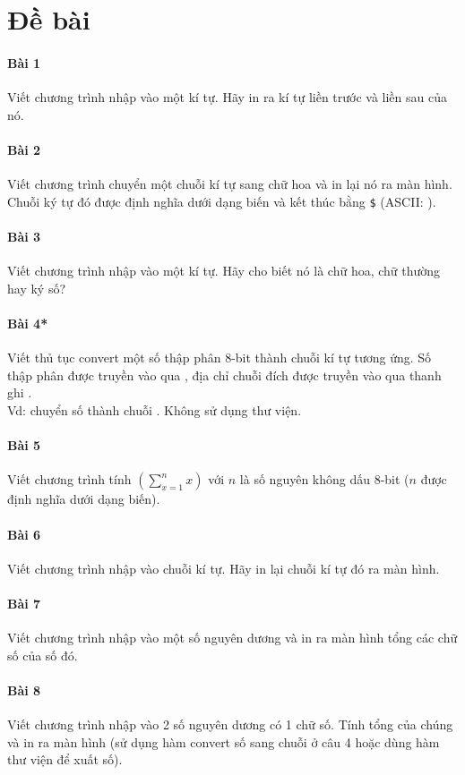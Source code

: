 \documentclass[main.tex]{subfiles}
\begin{document}
\newcommand{\textD}{\textcolor{OliveGreen}{\cd{Đ}}}
\newcommand{\textS}{\textcolor{red}{\cd{S}}}

\section{Đề bài}
\paragraph{Bài 1} Viết chương trình nhập vào một kí tự. Hãy in ra kí tự liền trước và liền sau của nó.
\paragraph{Bài 2} Viết chương trình chuyển một chuỗi kí tự sang chữ hoa và in lại nó ra màn hình. Chuỗi ký tự đó được định nghĩa dưới dạng biến và kết thúc bằng \verb#$# (ASCII: ).
\paragraph{Bài 3} Viết chương trình nhập vào một kí tự. Hãy cho biết nó là chữ hoa, chữ thường hay ký số?
\paragraph{Bài 4*} Viết thủ tục convert một số thập phân 8-bit thành chuỗi kí tự tương ứng. Số thập phân được truyền vào qua , địa chỉ chuỗi đích được truyền vào qua thanh ghi .\\Vd: chuyển số  thành chuỗi . Không sử dụng thư viện.
\paragraph{Bài 5} Viết chương trình tính $\left(\sum^{n}_{x=1}x\right)$ với $n$ là số nguyên không dấu 8-bit ($n$ được định nghĩa dưới dạng biến).
\paragraph{Bài 6} Viết chương trình nhập vào chuỗi kí tự. Hãy in lại chuỗi kí tự đó ra màn hình.
\paragraph{Bài 7} Viết chương trình nhập vào một số nguyên dương và in ra màn hình tổng các chữ số của số đó.
\paragraph{Bài 8} Viết chương trình nhập vào 2 số nguyên dương có 1 chữ số. Tính tổng của chúng và in ra màn hình (sử dụng hàm convert số sang chuỗi ở câu 4 hoặc dùng hàm thư viện để xuất số).
\end{document}
